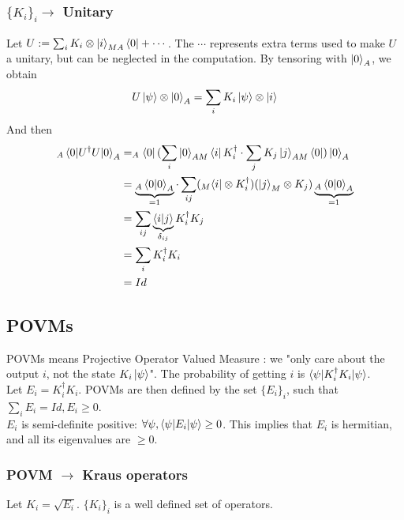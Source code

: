 \documentclass{article}
\begin{document}
\subsubsection*{$\{K_i\}_i \rightarrow$ Unitary}
Let $U := \sum_i K_i \otimes \ket{i}_{MA}\bra{0} + \cdots $.
The $\cdots$ represents extra terms used to make $U$ a unitary, but can be neglected in the computation.
By tensoring with $\ket{0}_A$, we obtain
\begin{equation}
    U\ket{\psi}\otimes \ket{0}_A = \sum_i K_i \ket{\psi}\otimes\ket{i}
\end{equation}
And then
\begin{equation}
    \begin{aligned}
        _A\braket{0 |U^\dagger U|0}_A
            & = _A\bra{0}(\sum_i\ket{0}_{AM}\bra{i} K_i^\dagger \cdot \sum_j K_j\ket{j}_{AM}\bra{0})\ket{0}_A \\
            & = \underbrace{_A\braket{0|0}_A}_{=1} \cdot \sum_{ij}(_M\bra{i}\otimes K_i^\dagger)(\ket{j}_M\otimes K_j) \underbrace{_A\braket{0|0}_A}_{=1} \\
            & = \sum_{ij}\underbrace{\braket{i|j}}_{\delta_{ij}} K_i^\dagger K_j \\
            & = \sum_i K_i^\dagger K_i \\
            & = Id
    \end{aligned}
\end{equation}
\subsection{POVMs}
POVMs means Projective Operator Valued Measure :
we "only care about the output $i$, not the state $K_i\ket{\psi}$".
The probability of getting $i$ is $\braket{\psi | K_i^\dagger K_i | \psi}$.\\
Let $E_i = K_i^\dagger K_i$.
POVMs are then defined by the set $\{E_i\}_i$, such that $\sum_i E_i = Id, E_i\geq 0$.\\

$E_i$ is semi-definite positive: $ \forall \psi, \braket{\psi|E_i|\psi} \geq 0$. This implies that $E_i$ is hermitian, and all its eigenvalues are $\geq 0$.
\subsubsection*{POVM $\rightarrow$ Kraus operators}
Let $K_i = \sqrt{E_i}$. $\{K_i\}_i$ is a well defined set of operators.
\end{document}
